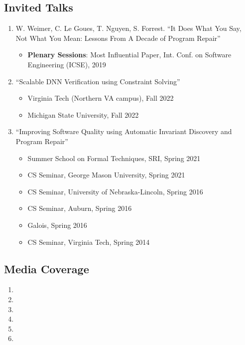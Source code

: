 \documentclass[11pt]{article}
\begin{document}
\subsection{Invited Talks}
\begin{enumerate}[label=T\arabic*]
    \item W. Weimer, C. Le Goues, T. Nguyen, S. Forrest. ``It Does What You Say, Not What You Mean: Lessons From A Decade of Program Repair''
    \begin{itemize}[label={},before=\small]
        \item \textbf{Plenary Sessions}:  Most Influential Paper, Int. Conf. on Software Engineering (ICSE), 2019
    \end{itemize}
    
    \item ``Scalable DNN Verification using Constraint Solving''
    \begin{itemize}[label={},before=\small]
        \item Virginia Tech (Northern VA campus), Fall 2022
        \item Michigan State University, Fall 2022
    \end{itemize}
    
    \item ``Improving Software Quality using Automatic Invariant Discovery and Program Repair''
    \begin{itemize}[label={},before=\small]
        \item Summer School on Formal Techniques, SRI, Spring 2021
        \item CS Seminar, George Mason University, Spring 2021
        \item CS Seminar, University of Nebraska-Lincoln, Spring 2016
        \item CS Seminar, Auburn, Spring 2016
        \item Galois, Spring 2016
        \item CS Seminar, Virginia Tech, Spring 2014
    \end{itemize}
\end{enumerate}



\subsection{Media Coverage}
\begin{enumerate}[label=M\arabic*]
    \item {}
    \item {}
    \item {}
    \item {}
    \item {}
    \item {}
\end{enumerate}
\end{document}
